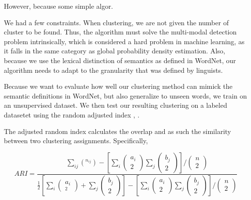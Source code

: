 \documentclass[a4paper,12pt,twoside,openright]{report}
\begin{document}
However, because some simple algor.

We had a few constraints.
When clustering, we are not given the number of cluster to be found. 
Thus, the algorithm must solve the multi-modal detection problem intrinsically, which is considered a hard problem in machine learning, as it falls in the same category as global probability density estimation.
Also, because we use the lexical distinction of semantics as defined in WordNet, our algorithm needs to adapt to the granularity that was defined by linguists.

Because we want to evaluate how well our clustering method can mimick the semantic definitions in WordNet, but also generalize to unseen words, we train on an unsupervised dataset. 
We then test our resulting clustering on a labeled datasetet using the random adjusted index \cite{rand71}, \cite{hubert85}.

The adjusted random index calculates the overlap and as such the similarity between two clustering assignments.
Specifically, 

\begin{equation}
A R I=\frac{\sum_{i j}\left(^{n_{i j}}\right)-\left[\sum_{i}\left(\begin{array}{c}a_{i} \\ 2\end{array}\right) \sum_{j}\left( \begin{array}{c}b_{j} \\ 2\end{array} \right)\right] /\left(\begin{array}{c}n \\ 2\end{array}\right)}{\frac{1}{2}\left[\sum_{i}\left(\begin{array}{c}a_{i} \\ _{2}\end{array}\right)+\sum_{j}\left(\begin{array}{l}b_{j} \\ 2\end{array}\right)\right]-\left[\sum_{i}\left(\begin{array}{c} a_{i} \\ 2\end{array}\right) \sum_{j}\left(\begin{array}{l}b_{j} \\ 2\end{array}\right)\right] /\left(\begin{array}{l}n \\ 2\end{array}\right)}
\end{equation}{\label{eq:adjustedrandomindex}}
\end{document}
